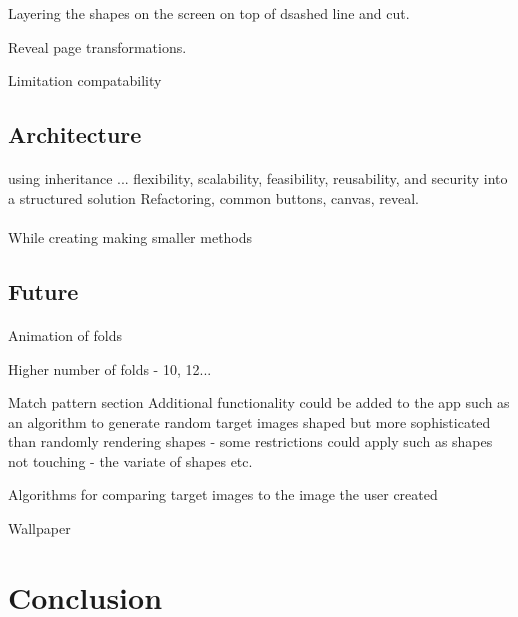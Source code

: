 \documentclass[11pt]{article}
\begin{document}
        
        Layering the shapes on the screen on top of dsashed line and cut.
        
        
        Reveal page transformations. 
        
        Limitation 
        compatability 
        
    \subsection{Architecture}
        
        \paragraph{}
using inheritance ... 
         flexibility, scalability, feasibility, reusability, and security into a structured solution
         Refactoring, common buttons, canvas, reveal. 
        
        \paragraph{}
        While creating making smaller methods
            
            
    \subsection{Future}
        
                \paragraph{}
                
                Animation of folds
                
                Higher number of folds - 10, 12...
                
                Match pattern section
                Additional functionality could be added to the app such as an algorithm to generate random target images shaped but more sophisticated than randomly rendering shapes - some restrictions could apply such as shapes not touching - the variate of shapes etc.
                
                Algorithms for comparing target images to the image the user created 
                
                
                Wallpaper
                
\newpage
\section{Conclusion}
        
\end{document}
